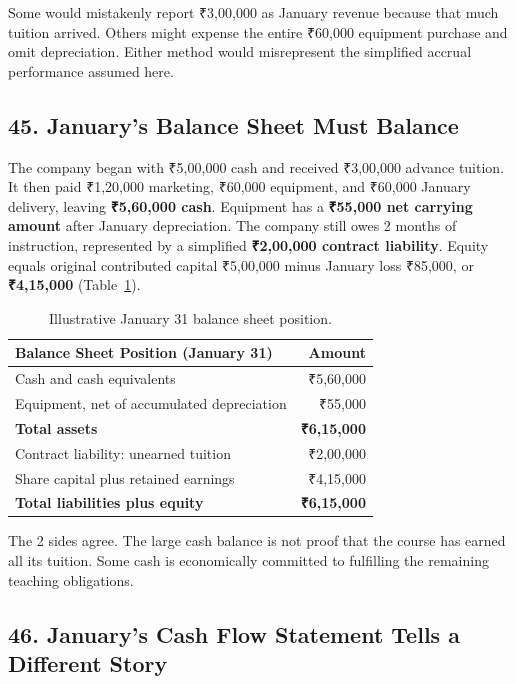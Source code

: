 Some would mistakenly report ₹3,00,000 as January revenue because that much tuition arrived. Others might expense the entire ₹60,000 equipment purchase and omit depreciation. Either method would misrepresent the simplified accrual performance assumed here.

\subsection*{45. January's Balance Sheet Must Balance}

The company began with ₹5,00,000 cash and received ₹3,00,000 advance tuition. It then paid ₹1,20,000 marketing, ₹60,000 equipment, and ₹60,000 January delivery, leaving \textbf{₹5,60,000 cash}. Equipment has a \textbf{₹55,000 net carrying amount} after January depreciation. The company still owes 2 months of instruction, represented by a simplified \textbf{₹2,00,000 contract liability}. Equity equals original contributed capital ₹5,00,000 minus January loss ₹85,000, or \textbf{₹4,15,000} (Table~\ref{tab:january-balance-sheet}).

\begin{table}[htbp]
\centering
\small
\begin{tabularx}{\columnwidth}{Xr}
\toprule
\textbf{Balance Sheet Position (January 31)} & \textbf{Amount} \\
\midrule
Cash and cash equivalents & ₹5,60,000 \\
Equipment, net of accumulated depreciation & ₹55,000 \\
\midrule
\textbf{Total assets} & \textbf{₹6,15,000} \\
\midrule
Contract liability: unearned tuition & ₹2,00,000 \\
Share capital plus retained earnings & ₹4,15,000 \\
\midrule
\textbf{Total liabilities plus equity} & \textbf{₹6,15,000} \\
\bottomrule
\end{tabularx}
\caption{Illustrative January 31 balance sheet position.}
\label{tab:january-balance-sheet}
\end{table}

The 2 sides agree. The large cash balance is not proof that the course has earned all its tuition. Some cash is economically committed to fulfilling the remaining teaching obligations.

\subsection*{46. January's Cash Flow Statement Tells a Different Story}

